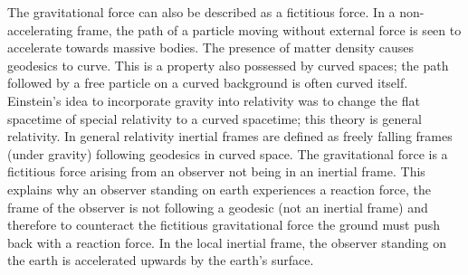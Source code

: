 The gravitational force can also be described as a fictitious force. In a non-accelerating frame, the path of a particle moving without external force is seen to accelerate towards massive bodies. The presence of matter density causes geodesics to curve. This is a property also possessed by curved spaces; the path followed by a free particle on a curved background is often curved itself. Einstein's idea to incorporate gravity into relativity was to change the flat spacetime of special relativity to a curved spacetime; this theory is general relativity.  In general relativity inertial frames are defined as freely falling frames (under gravity) following geodesics in curved space. The gravitational force is a fictitious force arising from an observer not being in an inertial frame. This explains why an observer standing on earth experiences a reaction force, the frame of the observer is not following a geodesic (not an inertial frame) and therefore to counteract the fictitious gravitational force the ground must push back with a reaction force. In the \color{orchid} local \color{black} inertial frame, the observer standing on the earth is accelerated upwards by the earth's surface.


